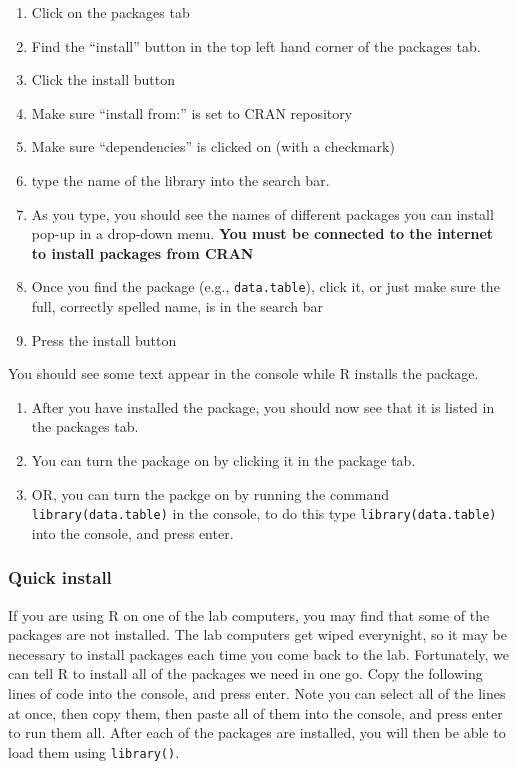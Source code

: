 \documentclass[]{book}
\providecommand{\tightlist}{%
  \setlength{\itemsep}{0pt}\setlength{\parskip}{0pt}}
\begin{document}
\begin{enumerate}
\def\labelenumi{\arabic{enumi}.}
\tightlist
\item
  Click on the packages tab
\item
  Find the ``install'' button in the top left hand corner of the
  packages tab.
\item
  Click the install button
\item
  Make sure ``install from:'' is set to CRAN repository
\item
  Make sure ``dependencies'' is clicked on (with a checkmark)
\item
  type the name of the library into the search bar.
\item
  As you type, you should see the names of different packages you can
  install pop-up in a drop-down menu. \textbf{You must be connected to
  the internet to install packages from CRAN}
\item
  Once you find the package (e.g., \texttt{data.table}), click it, or
  just make sure the full, correctly spelled name, is in the search bar
\item
  Press the install button
\end{enumerate}

You should see some text appear in the console while R installs the
package.

\begin{enumerate}
\def\labelenumi{\arabic{enumi}.}
\setcounter{enumi}{9}
\tightlist
\item
  After you have installed the package, you should now see that it is
  listed in the packages tab.
\item
  You can turn the package on by clicking it in the package tab.
\item
  OR, you can turn the packge on by running the command
  \texttt{library(data.table)} in the console, to do this type
  \texttt{library(data.table)} into the console, and press enter.
\end{enumerate}

\subsubsection{Quick install}\label{quick-install}

If you are using R on one of the lab computers, you may find that some
of the packages are not installed. The lab computers get wiped
everynight, so it may be necessary to install packages each time you
come back to the lab. Fortunately, we can tell R to install all of the
packages we need in one go. Copy the following lines of code into the
console, and press enter. Note you can select all of the lines at once,
then copy them, then paste all of them into the console, and press enter
to run them all. After each of the packages are installed, you will then
be able to load them using \texttt{library()}.
\end{document}
